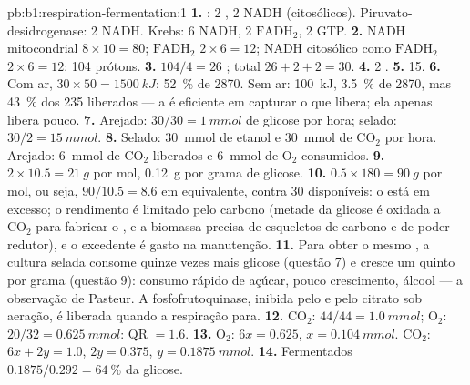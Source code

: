 \begin{solution}{pb:b1:respiration-fermentation:1}
\textbf{1.} : 2 , 2 NADH (citosólicos).
Piruvato-desidrogenase: 2 NADH. Krebs: 6 NADH, 2 $\mathrm{FADH_2}$,
2 GTP.
\textbf{2.} NADH mitocondrial $8\times 10 = 80$; $\mathrm{FADH_2}$
$2\times 6 = 12$; NADH citosólico como $\mathrm{FADH_2}$ $2\times 6 = 12$:
104 prótons.
\textbf{3.} $104/4 = 26$ ; total $26 + 2 + 2 = 30$.
\textbf{4.} 2 .
\textbf{5.} 15.
\textbf{6.} Com ar, $30\times 50 = \qty{1500}{kJ}$: \qty{52}{\%} de
2870. Sem ar: \qty{100}{kJ}, \qty{3.5}{\%} de 2870, mas \qty{43}{\%} dos
235 liberados --- a  é eficiente em capturar o que libera; ela
apenas libera pouco.
\textbf{7.} Arejado: $30/30 = \qty{1}{mmol}$ de glicose por hora;
selado: $30/2 = \qty{15}{mmol}$.
\textbf{8.} Selado: \qty{30}{mmol} de etanol e \qty{30}{mmol} de
$\mathrm{CO_2}$ por hora. Arejado: \qty{6}{mmol} de $\mathrm{CO_2}$
liberados e \qty{6}{mmol} de $\mathrm{O_2}$ consumidos.
\textbf{9.} $2\times 10.5 = \qty{21}{g}$ por mol, \qty{0.12}{g} por
grama de glicose.
\textbf{10.} $0.5\times 180 = \qty{90}{g}$ por mol, ou seja, $90/10.5 =
8.6$  em equivalente, contra 30 disponíveis: o  está em excesso; o
rendimento é limitado pelo carbono (metade da glicose é oxidada a
$\mathrm{CO_2}$ para fabricar o , e a biomassa precisa de esqueletos
de carbono e de poder redutor), e o  excedente é gasto na manutenção.
\textbf{11.} Para obter o mesmo , a cultura selada consome quinze
vezes mais glicose (questão 7) e cresce um quinto por grama (questão 9):
consumo rápido de açúcar, pouco crescimento, álcool --- a observação de
Pasteur. A fosfofrutoquinase, inibida pelo  e pelo citrato sob
aeração, é liberada quando a respiração para.
\textbf{12.} $\mathrm{CO_2}$: $44/44 = \qty{1.0}{mmol}$;
$\mathrm{O_2}$: $20/32 = \qty{0.625}{mmol}$: QR $= 1.6$.
\textbf{13.} $\mathrm{O_2}$: $6x = 0.625$, $x = \qty{0.104}{mmol}$.
$\mathrm{CO_2}$: $6x + 2y = 1.0$, $2y = 0.375$, $y = \qty{0.1875}{mmol}$.
\textbf{14.} Fermentados $0.1875/0.292 = \qty{64}{\%}$ da glicose. 

\end{solution}

